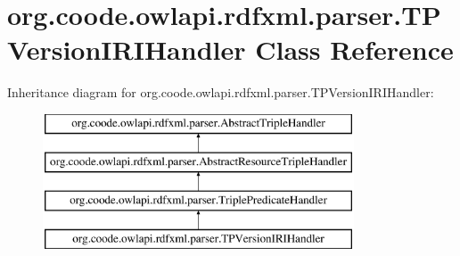 \hypertarget{classorg_1_1coode_1_1owlapi_1_1rdfxml_1_1parser_1_1_t_p_version_i_r_i_handler}{\section{org.\-coode.\-owlapi.\-rdfxml.\-parser.\-T\-P\-Version\-I\-R\-I\-Handler Class Reference}
\label{classorg_1_1coode_1_1owlapi_1_1rdfxml_1_1parser_1_1_t_p_version_i_r_i_handler}
}
Inheritance diagram for org.\-coode.\-owlapi.\-rdfxml.\-parser.\-T\-P\-Version\-I\-R\-I\-Handler\-:\begin{figure}[H]
\begin{center}
\leavevmode
\includegraphics[height=4.000000cm]{classorg_1_1coode_1_1owlapi_1_1rdfxml_1_1parser_1_1_t_p_version_i_r_i_handler}
\end{center}
\end{figure}
